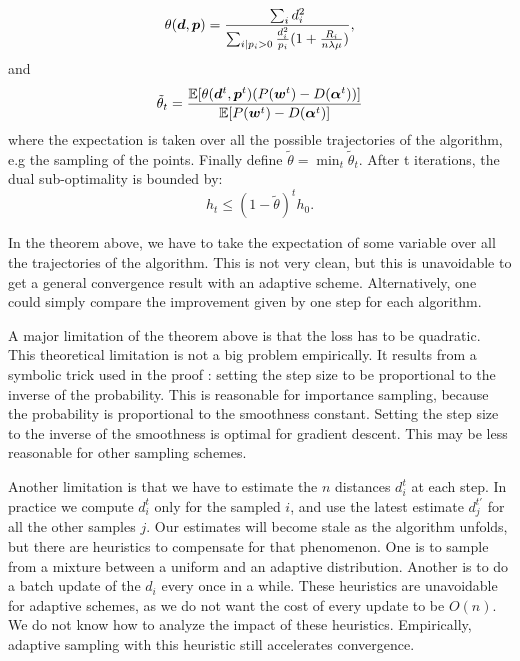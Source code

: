 \begin{subappendices}
\begin{theorem}
		\begin{equation}
			\theta(\bm d, \bm p) = \frac{\sum_i d_i^2}{\sum_{i | p_i >0} \frac{d_i^2}{p_i} (1+ \frac{R_i}{n \lambda \mu}) },
		\end{equation}
		and
		\begin{equation}
			\tilde \theta_t =  \frac{\operatorname{\mathbb{E}}[\theta(\bm d^t,\bm p^t) (P(\boldsymbol{w}^t) - D(\boldsymbol{\alpha}^t))] }{ \operatorname{\mathbb{E}}[P(\boldsymbol{w}^t) - D(\boldsymbol{\alpha}^t) ] }
		\end{equation}
		where the expectation is taken over all the possible trajectories of the algorithm, e.g the sampling of the points.
		Finally define $\tilde \theta = \min_t \tilde \theta_t$.
		After t iterations, the dual sub-optimality is bounded by:
		\begin{equation}
			h_t \leq (1- \tilde \theta )^t  h_0.
		\end{equation}
	\end{theorem}

	In the theorem above, we have to take the expectation of some variable over all the trajectories of the algorithm.
	This is not very clean, but this is unavoidable to get a general convergence result with an adaptive scheme.
	Alternatively, one could simply compare the improvement given by one step for each algorithm.

	A major limitation of the theorem above is that the loss has to be quadratic.
	This theoretical limitation is not a big problem empirically.
	It results from a symbolic trick used in the proof : setting the step size to be proportional to the inverse of the probability.
	This is reasonable for importance sampling, because the probability is proportional to the smoothness constant.
	Setting the step size to the inverse of the smoothness is optimal for gradient descent.
	This may be less reasonable for other sampling schemes.

	Another limitation is that we have to estimate the $n$ distances $d_i^t$ at each step.
	In practice we compute $d_i^t$ only for the sampled $i$, and use the latest estimate $d_j^{t'}$ for all the other samples $j$.
	Our estimates will become stale as the algorithm unfolds, but there are heuristics to compensate for that phenomenon.
	One is to sample from a mixture between a uniform and an adaptive distribution.
	Another is to do a batch update of the $d_i$ every once in a while.
	These heuristics are unavoidable for adaptive schemes, as we do not want the cost of every update to be $O(n)$.
	We do not know how  to analyze the impact of these heuristics.
	Empirically, adaptive sampling with this heuristic still accelerates convergence.


\end{subappendices}
